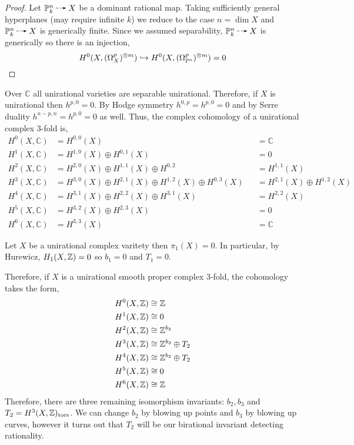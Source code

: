 \documentclass[12pt]{article}
\newcommand{\tors}{\mathrm{tors}}
\renewcommand{\C}{\mathbb{C}}
\begin{document}
\begin{proof}
Let $\P^n_k \rat X$ be a dominant rational map. Taking sufficiently general hyperplanes (may require infinite $k$) we reduce to the case $n = \dim{X}$ and $\P^n_k \rat X$ is generically finite. Since we assumed separability, $\P^n_k \rat X$ is generically \etale so there is an injection,
\[ H^0(X, (\Omega_X^p)^{\otimes m}) \hookrightarrow H^0(X, (\Omega_{\mathbb{P}^n}^p)^{\otimes m}) = 0 \]
\end{proof}

\begin{rmk}
Over $\C$ all unirational varieties are separable unirational. Therefore, if $X$ is unirational then $h^{p, 0} = 0$. By Hodge symmetry $h^{0,p} = h^{p, 0} = 0$ and by Serre duality $h^{n-p,n} = h^{p,0} = 0$ as well. Thus, the complex cohomology of a unirational complex $3$-fold is,
\begin{align*}
H^0(X, \C) & = H^{0,0}(X) & & = \C
\\
H^1(X, \C) & = H^{1,0}(X) \oplus H^{0,1}(X) & & = 0
\\
H^2(X, \C) & = H^{2,0}(X) \oplus H^{1,1}(X) \oplus H^{0,2} & & = H^{1,1}(X)
\\
H^3(X, \C) & = H^{3,0}(X) \oplus H^{2,1}(X) \oplus H^{1,2}(X) \oplus H^{0,3}(X) & & =  H^{2,1}(X) \oplus H^{1,2}(X)
\\
H^4(X, \C) & = H^{3, 1}(X) \oplus H^{2, 2}(X) \oplus H^{3, 1}(X) & &  =H^{2, 2}(X)
\\
H^5(X, \C) & = H^{3, 2}(X) \oplus H^{2, 3}(X) & &  = 0
\\
H^6(X, \C) & = H^{3,3}(X) & & = \C
\end{align*}
\end{rmk}

\begin{thm}[Serre]
Let $X$ be a unirational complex varitety then $\pi_1(X) = 0$. In particular, by Hurewicz, $H_1(X, \mathbb{Z}) = 0$ so $b_1 = 0$ and $T_1 = 0$.
\end{thm}

\begin{rmk}
Therefore, if $X$ is a unirational smooth proper complex $3$-fold, the cohomology takes the form,
\begin{align*}
H^0(X, \mathbb{Z}) & \cong \mathbb{Z} 
\\
H^1(X, \mathbb{Z}) & \cong 0
\\
H^2(X, \mathbb{Z}) & \cong \mathbb{Z}^{b_2}
\\
H^3(X, \mathbb{Z}) & \cong \mathbb{Z}^{b_3} \oplus T_2
\\
H^4(X, \mathbb{Z}) & \cong \mathbb{Z}^{b_2} \oplus T_2
\\
H^5(X, \mathbb{Z}) & \cong 0
\\
H^6(X, \mathbb{Z}) & \cong \mathbb{Z}
\end{align*}
Therefore, there are three remaining isomorphism invariants: $b_2, b_3$ and $T_2 = H^3(X, \Z)_{\tors}$. We can change $b_2$ by blowing up points and $b_3$ by blowing up curves, however it turns out that $T_2$ will be our birational invariant detecting rationality.

\end{rmk}
\end{document}
